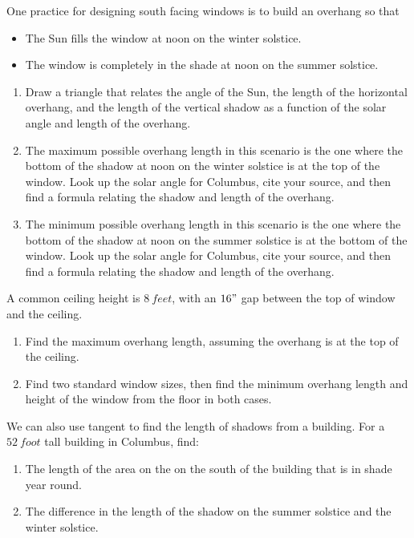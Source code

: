 \documentclass[noauthor,nooutcomes,handout,hints]{ximera}
\begin{document}
\mynewpage


\begin{question}
 One practice for designing south facing windows is to build an
 overhang so that
 \begin{itemize}
 \item The Sun fills the window at noon on the winter solstice.
 \item The window is completely in the shade at noon on the summer
   solstice.
 \end{itemize}
\begin{enumerate}
\item Draw a triangle that relates the angle of the Sun, the length of
  the horizontal overhang, and the length of the vertical shadow as a
  function of the solar angle and length of the overhang.
\item The maximum possible overhang length in this scenario is the one
  where the bottom of the shadow at noon on the winter solstice is at
  the top of the window. Look up the solar angle for Columbus, cite
  your source, and then find a formula relating the shadow and length
  of the overhang.
\item The minimum possible overhang length in this scenario is the one
  where the bottom of the shadow at noon on the summer solstice is at
  the bottom of the window. Look up the solar angle for Columbus, cite
  your source, and then find a formula relating the shadow and length
  of the overhang.
\end{enumerate}
\end{question}
\mynewpage


\begin{question}
 A common ceiling height is $8\ feet$, with an $16"$ gap between the top of window and the ceiling. 
 
\begin{enumerate}
 \item Find the maximum overhang length, assuming the overhang is at the top of the ceiling.
 \item Find two standard window sizes, then find the minimum overhang length and height of the window from the floor in both cases.
\end{enumerate}
\end{question}
\mynewpage

\begin{question}
 We can also use tangent to find the length of shadows from a building. For a $52\ foot$ tall building in Columbus, find:
 
\begin{enumerate}
 \item The length of the area on the on the south of the building that is in shade year round.
 \item The difference in the length of the shadow on the summer solstice and the winter solstice.
\end{enumerate}
\end{question}
\end{document}
